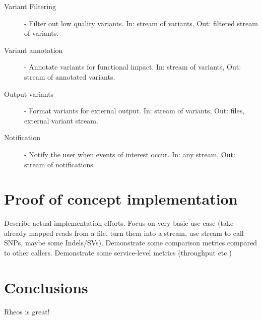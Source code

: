 \begin{description}
    \item [Variant Filtering] - Filter out low quality variants. In: stream of variants, Out: filtered stream of variants.
    \item [Variant annotation] - Annotate variants for functional impact. In: stream of variants, Out: stream of annotated variants.
    \item [Output variants] - Format variants for external output. In: stream of variants, Out: files, external variant stream.
    \item [Notification] - Notify the user when events of interest occur. In: any stream, Out: stream of notifications.
\end{description}

\section{Proof of concept implementation}

Describe actual implementation efforts. Focus on very basic use case (take already mapped reads from a file, turn them into a stream, use stream to call SNPs, maybe some Indels/SVs). Demonstrate some comparison metrics compared to other callers. Demonstrate some service-level metrics (throughput etc.)

\section{Conclusions}
Rheos is great!